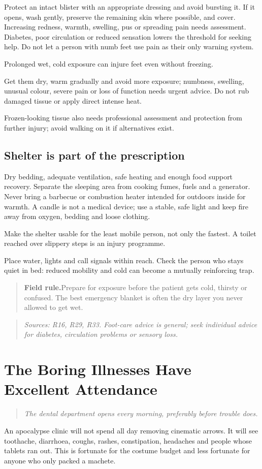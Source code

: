 \documentclass[10pt,openright]{book}
\newcommand{\fieldrule}[1]{\begin{quote}\textbf{Field rule.}\enspace #1\end{quote}}
\begin{document}
Protect an intact blister with an appropriate dressing and avoid bursting it. If it opens, wash gently, preserve the remaining skin where possible, and cover. Increasing redness, warmth, swelling, pus or spreading pain needs assessment. Diabetes, poor circulation or reduced sensation lowers the threshold for seeking help. Do not let a person with numb feet use pain as their only warning system.

Prolonged wet, cold exposure can injure feet even without freezing.

Get them dry, warm gradually and avoid more exposure; numbness, swelling, unusual colour, severe pain or loss of function needs urgent advice. Do not rub damaged tissue or apply direct intense heat.

Frozen-looking tissue also needs professional assessment and protection from further injury; avoid walking on it if alternatives exist.

\section*{Shelter is part of the prescription}
Dry bedding, adequate ventilation, safe heating and enough food support recovery. Separate the sleeping area from cooking fumes, fuels and a generator. Never bring a barbecue or combustion heater intended for outdoors inside for warmth. A candle is not a medical device; use a stable, safe light and keep fire away from oxygen, bedding and loose clothing.

Make the shelter usable for the least mobile person, not only the fastest. A toilet reached over slippery steps is an injury programme.

Place water, lights and call signals within reach. Check the person who stays quiet in bed: reduced mobility and cold can become a mutually reinforcing trap.

\fieldrule{Prepare for exposure before the patient gets cold, thirsty or confused. The best emergency blanket is often the dry layer you never allowed to get wet.}
\begin{quote}\emph{Sources: R16, R29, R33. Foot-care advice is general; seek individual advice for diabetes, circulation problems or sensory loss.}\end{quote}
\chapter{The Boring Illnesses Have Excellent Attendance}
\begin{quote}\emph{The dental department opens every morning, preferably before trouble does.}\end{quote}
An apocalypse clinic will not spend all day removing cinematic arrows. It will see toothache, diarrhoea, coughs, rashes, constipation, headaches and people whose tablets ran out. This is fortunate for the costume budget and less fortunate for anyone who only packed a machete.
\end{document}
